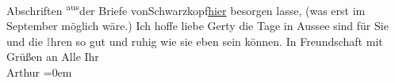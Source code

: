 \begin{ledgroupsized}[t]{13cm}
               Abschriften \substVorne{}\textsuperscript{aus}\substDazwischen{}der Briefe von\substHinten{}{ }Schwarzkopf\uline{hier} besorgen lasse, (was erst im
                  September möglich wäre.)\pend
           \pstart
           Ich hoffe liebe Gerty die Tage in Aussee sind für
               Sie und die \textcolor{gray}{I}hren so gut und ruhig wie sie eben sein können. In
               Freundschaft mit Grüßen an Alle\pend
           \pstart
           Ihr{\\[\baselineskip]}\spacefill\mbox{Arthur}\pend
           \leftskip=0em{}
         
         \endnumbering{}\end{ledgroupsized}  \newcommand{\dateiname}{L02516}\newcommand{\titel}{Arthur Schnitzler an Gerty von Hofmannsthal, 2. 8. 1929}\newcommand{\editorInnen}{Martin Anton Müller und Gerd-Hermann Susen}
      